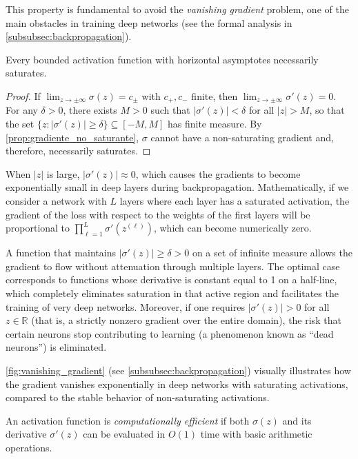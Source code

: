 This property is fundamental to avoid the \textit{vanishing gradient} problem, one of the main obstacles in training deep networks (see the formal analysis in \autoref{subsubsec:backpropagation}).

\begin{corollary}
Every bounded activation function with horizontal asymptotes necessarily saturates.
\end{corollary}

\begin{proof}
If $\lim_{z \to \pm\infty} \sigma(z) = c_{\pm}$ with $c_+, c_-$ finite, then $\lim_{z \to \pm\infty} \sigma'(z) = 0$. For any $\delta > 0$, there exists $M > 0$ such that $|\sigma'(z)| < \delta$ for all $|z| > M$, so that the set $\{z : |\sigma'(z)| \geq \delta\} \subseteq [-M, M]$ has finite measure. By \autoref{prop:gradiente_no_saturante}, $\sigma$ cannot have a non-saturating gradient and, therefore, necessarily saturates.
\end{proof}

When $|z|$ is large, $|\sigma'(z)| \approx 0$, which causes the gradients to become exponentially small in deep layers during backpropagation. Mathematically, if we consider a network with $L$ layers where each layer has a saturated activation, the gradient of the loss with respect to the weights of the first layers will be proportional to $\prod_{\ell=1}^{L} \sigma'(z^{(\ell)})$, which can become numerically zero.

A function that maintains $|\sigma'(z)| \geq \delta > 0$ on a set of infinite measure allows the gradient to flow without attenuation through multiple layers. The optimal case corresponds to functions whose derivative is constant equal to 1 on a half-line, which completely eliminates saturation in that active region and facilitates the training of very deep networks. Moreover, if one requires $|\sigma'(z)| > 0$ for all $z \in \mathbb{R}$ (that is, a strictly nonzero gradient over the entire domain), the risk that certain neurons stop contributing to learning (a phenomenon known as ``dead neurons'') is eliminated.

\autoref{fig:vanishing_gradient} (see \autoref{subsubsec:backpropagation}) visually illustrates how the gradient vanishes exponentially in deep networks with saturating activations, compared to the stable behavior of non-saturating activations.

\begin{definition}\label{prop:eficiencia_computacional}
	An activation function is \textit{computationally efficient} if both $\sigma(z)$ and its derivative $\sigma'(z)$ can be evaluated in $O(1)$ time with basic arithmetic operations.
\end{definition}

